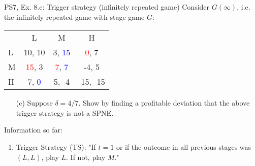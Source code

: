 \begin{frame}{PS7, Ex. 8.c: Trigger strategy (infinitely repeated game)}
    Consider $G(\infty)$, i.e. the infinitely repeated game with stage game $G$: \vspace{-6pt}
    \begin{table}
      \begin{tabular}{l|c|c|c|}
        \multicolumn{1}{c}{} & \multicolumn{1}{c}{L} & \multicolumn{1}{c}{M} & \multicolumn{1}{c}{H} \\\cline{2-4}
        L & 10, 10 & 3, \textcolor{blue}{15} & \textcolor{red}{0}, 7 \\\cline{2-4}
        M & \textcolor{red}{15}, 3 & \textcolor{red}{7}, \textcolor{blue}{7} & -4, 5 \\\cline{2-4}
        H & 7, \textcolor{blue}{0} & 5, -4 & -15, -15 \\\cline{2-4}
      \end{tabular}
    \end{table}
    \begin{itemize}
      \vspace{-4pt} \item[(c)] Suppose $\delta = 4/7$. Show by finding a profitable deviation that the above trigger strategy is not a SPNE. \vspace{-6pt}
    \end{itemize}
  \begin{multicols}{2}
    \vfill\null\columnbreak
    Information so far:
    \begin{enumerate}
      \item Trigger Strategy (TS): "If $t=1$ or if the outcome in all previous stages was $(L,L)$, play $L$. If not, play $M$."
    \end{enumerate}
    \vfill\null
  \end{multicols}
\end{frame}
